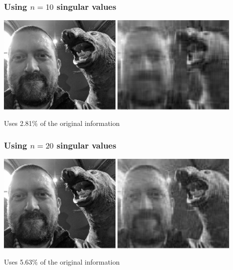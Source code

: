 \documentclass[aspectratio=169]{beamer}\usepackage[]{graphicx}\usepackage[]{xcolor}
\begin{document}
\begin{frame}\frametitle{Using $n=10$ singular values}
\begin{center}
\includegraphics[width=0.45\textwidth]{FIGS/matrix-methods-plot-image-svd-original-1.png}
\includegraphics[width=0.45\textwidth]{FIGS/matrix-methods-plot-image-svd-n10-1.png}
\end{center}
\vfill
Uses 2.81\% of the original information
\end{frame}





\begin{frame}\frametitle{Using $n=20$ singular values}
\begin{center}
\includegraphics[width=0.45\textwidth]{FIGS/matrix-methods-plot-image-svd-original-1.png}
\includegraphics[width=0.45\textwidth]{FIGS/matrix-methods-plot-image-svd-n20-1.png}
\end{center}
\vfill
Uses 5.63\% of the original information
\end{frame}
\end{document}
